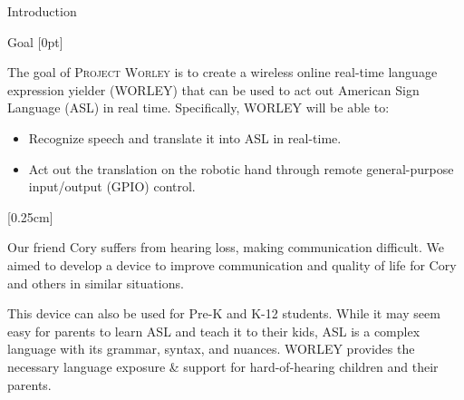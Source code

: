 \documentclass[final, 20pt]{beamer}
\newlength{\colwidth}
\begin{document}
\begin{frame}[t]
\begin{columns}[t]
\begin{column}{\colwidth}
\begin{block}{Introduction}
  \end{block}

  \begin{block}{Goal}
    [0pt]

    The goal of \textsc{Project Worley} is to create a wireless online real-time language expression yielder (WORLEY) that can be used to act out American Sign Language (ASL) in real time. Specifically, WORLEY will be able to:

    \begin{itemize}
      \item Recognize speech and translate it into ASL in real-time.
      \item Act out the translation on the robotic hand through remote general-purpose input/output (GPIO) control.
    \end{itemize}

    [0.25cm]

    Our friend Cory suffers from hearing loss, making communication difficult. We aimed to develop a device to improve communication and quality of life for Cory and others in similar situations.

    This device can also be used for Pre-K and K-12 students.  While it may seem easy for parents to learn ASL and teach it to their kids, ASL is a complex language with its grammar, syntax, and nuances. WORLEY provides the necessary language exposure \& support for hard-of-hearing children and their parents.
  \end{block}
\end{column}

\separatorcolumn


\end{columns}
\end{frame}
\end{document}
